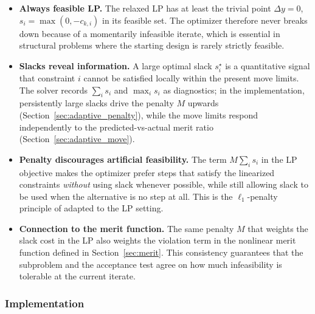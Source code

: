 \begin{itemize}[nosep,leftmargin=1.5em]
    \item \textbf{Always feasible LP.} The relaxed LP has at least the
          trivial point $\Delta y = 0$, $s_i = \max(0, -c_{k,i})$ in its
          feasible set. The optimizer therefore never breaks down because
          of a momentarily infeasible iterate, which is essential in
          structural problems where the starting design is rarely
          strictly feasible.
    \item \textbf{Slacks reveal information.} A large optimal slack
          $s_i^{\star}$ is a quantitative signal that constraint $i$
          cannot be satisfied locally within the present move limits.
          The solver records $\sum_i s_i$ and $\max_i s_i$ as
          diagnostics; in the implementation, persistently large slacks
          drive the penalty $M$ upwards
          (Section~\ref{sec:adaptive_penalty}), while the move limits
          respond independently to the predicted-vs-actual merit ratio
          (Section~\ref{sec:adaptive_move}).
    \item \textbf{Penalty discourages artificial feasibility.} The term
          $M \sum_i s_i$ in the LP objective makes the optimizer prefer
          steps that satisfy the linearized constraints \emph{without}
          using slack whenever possible, while still allowing slack to
          be used when the alternative is no step at all. This is the
          $\ell_1$-penalty principle of \citet{Fletcher1987} adapted to
          the LP setting.
    \item \textbf{Connection to the merit function.} The same penalty
          $M$ that weights the slack cost in the LP also weights the
          violation term in the nonlinear merit function defined in
          Section~\ref{sec:merit}. This consistency guarantees that the
          subproblem and the acceptance test agree on how much
          infeasibility is tolerable at the current iterate.
\end{itemize}

\subsubsection*{Implementation}

